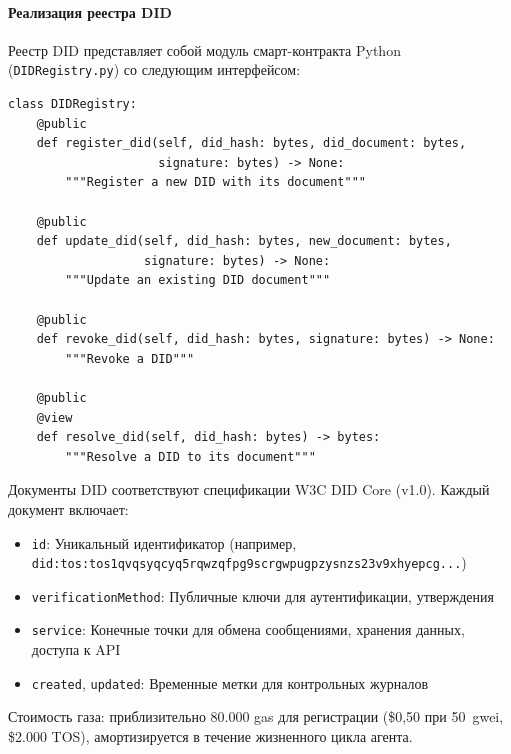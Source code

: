\documentclass[11pt]{article}
\begin{document}
\paragraph{Реализация реестра DID} Реестр DID представляет собой модуль смарт-контракта Python (\texttt{DIDRegistry.py}) со следующим интерфейсом:
\begin{verbatim}
class DIDRegistry:
    @public
    def register_did(self, did_hash: bytes, did_document: bytes,
                     signature: bytes) -> None:
        """Register a new DID with its document"""

    @public
    def update_did(self, did_hash: bytes, new_document: bytes,
                   signature: bytes) -> None:
        """Update an existing DID document"""

    @public
    def revoke_did(self, did_hash: bytes, signature: bytes) -> None:
        """Revoke a DID"""

    @public
    @view
    def resolve_did(self, did_hash: bytes) -> bytes:
        """Resolve a DID to its document"""
\end{verbatim}
Документы DID соответствуют спецификации W3C DID Core (v1.0). Каждый документ включает:
\begin{itemize}[noitemsep]
  \item \texttt{id}: Уникальный идентификатор (например, \texttt{did:tos:tos1qvqsyqcyq5rqwzqfpg9scrgwpugpzysnzs23v9xhyepcg...})
  \item \texttt{verificationMethod}: Публичные ключи для аутентификации, утверждения
  \item \texttt{service}: Конечные точки для обмена сообщениями, хранения данных, доступа к API
  \item \texttt{created}, \texttt{updated}: Временные метки для контрольных журналов
\end{itemize}
Стоимость газа: приблизительно 80.000 gas для регистрации (\$0,50 при 50~gwei, \$2.000 TOS), амортизируется в течение жизненного цикла агента.
\end{document}
